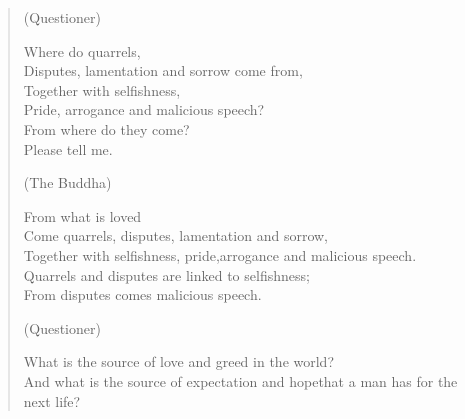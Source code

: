 
\begin{verse}

(Questioner)
\vspace*{-0.5\baselineskip}

 Where do quarrels,\\
Disputes, lamentation and sorrow come from,\\
Together with selfishness,\\
Pride, arrogance and malicious speech?\\
From where do they come?\\
Please tell me.


(The Buddha)
\vspace*{-0.5\baselineskip}

 From what is loved\\
Come quarrels, disputes, lamentation and sorrow,\\
Together with selfishness, pride,\newline arrogance and malicious speech.\\
Quarrels and disputes are linked to selfishness;\\
From disputes comes malicious speech.


(Questioner)

 What is the source of love and greed in the world?\\
And what is the source of expectation and hope\newline that a man has for the next life?



\end{verse}
